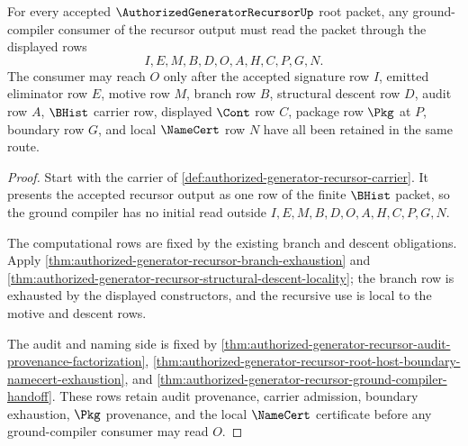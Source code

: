 \begin{theorem}
\label{thm:authorized-generator-recursor-ground-compiler-authorization}
For every accepted $\AuthorizedGeneratorRecursorUp$ root packet, any ground-compiler consumer of the recursor output must read the packet through the displayed rows
$$
I,E,M,B,D,O,A,H,C,P,G,N.
$$
The consumer may reach $O$ only after the accepted signature row $I$, emitted eliminator row $E$, motive row $M$, branch row $B$, structural descent row $D$, audit row $A$, $\BHist$ carrier row, displayed $\Cont$ row $C$, package row $\Pkg$ at $P$, boundary row $G$, and local $\NameCert$ row $N$ have all been retained in the same route.
\end{theorem}
\begin{proof}
Start with the carrier of \autoref{def:authorized-generator-recursor-carrier}. It presents the accepted recursor output as one row of the finite $\BHist$ packet, so the ground compiler has no initial read outside $I,E,M,B,D,O,A,H,C,P,G,N$.

The computational rows are fixed by the existing branch and descent obligations. Apply \autoref{thm:authorized-generator-recursor-branch-exhaustion} and \autoref{thm:authorized-generator-recursor-structural-descent-locality}; the branch row is exhausted by the displayed constructors, and the recursive use is local to the motive and descent rows.

The audit and naming side is fixed by \autoref{thm:authorized-generator-recursor-audit-provenance-factorization}, \autoref{thm:authorized-generator-recursor-root-host-boundary-namecert-exhaustion}, and \autoref{thm:authorized-generator-recursor-ground-compiler-handoff}. These rows retain audit provenance, carrier admission, boundary exhaustion, $\Pkg$ provenance, and the local $\NameCert$ certificate before any ground-compiler consumer may read $O$.
\end{proof}

